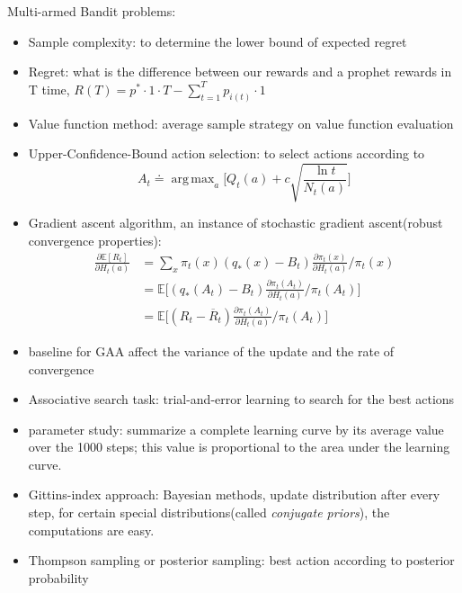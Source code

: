 \documentclass[12pt, letterpaper]{article}
\DeclareMathOperator*{\argmax}{arg\,max}
\begin{document}
Multi-armed Bandit problems:
\begin{itemize}
  \item Sample complexity: to determine the lower bound of expected regret
  \item Regret: what is the difference between our rewards and a prophet rewards in T time, $R(T) = p^* \cdot 1 \cdot T -  \sum_{t=1}^{T} p_{i(t)} \cdot 1$
  \item Value function method: average sample strategy on value function evaluation
  \item Upper-Confidence-Bound action selection: to select actions according to
  \begin{equation}
	A_t \doteq \argmax_a \Big [ Q_t (a) + c \sqrt{\frac {\ln t} {N_t (a)}} \Big ]
  \end{equation}
  \item Gradient ascent algorithm, an instance of stochastic gradient ascent(robust convergence properties): 
  \begin{equation}
	\begin{aligned}
	\frac{\partial \mathbb{E}[R_t]}{\partial H_t (a)} &= \sum_{x} \pi_t (x) (q_{*}(x) - B_t) \frac {\partial \pi_t (x)} {\partial H_t (a)} / \pi_t (x) \\
	&= \mathbb{E} \Big [ (q_* (A_t) - B_t) \frac {\partial \pi_t (A_t)} {\partial H_t (a)} / \pi_t (A_t) \Big ] \\
	&= \mathbb{E} \Big [ (R_t - \overline{R}_t) \frac {\partial \pi_t (A_t)} {\partial H_t (a)} / \pi_t (A_t) \Big ]
	\end{aligned}
  \end{equation}
  \item baseline for GAA affect the variance of the update and the rate of convergence
  \item Associative search task: trial-and-error learning to search for the best actions
  \item parameter study: summarize a complete learning curve by its average value over the 1000 steps; this value is proportional to the area under the learning curve.
  \item Gittins-index approach: Bayesian methods, update distribution after every step, for certain special distributions(called \textit{conjugate priors}), the computations are easy.
  \item Thompson sampling or posterior sampling: best action according to posterior probability
\end{itemize}
\end{document}
